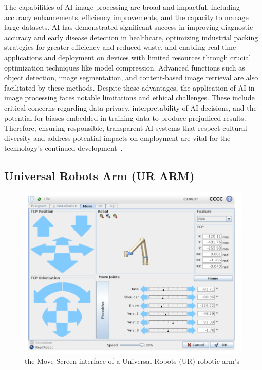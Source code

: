 \documentclass[12pt]{extarticle}
\begin{document}
The capabilities of AI image processing are broad and impactful, including accuracy enhancements, efficiency improvements, and the capacity to manage large datasets. AI has demonstrated significant success in improving diagnostic accuracy and early disease detection in healthcare, optimizing industrial packing strategies for greater efficiency and reduced waste, and enabling real-time applications and deployment on devices with limited resources through crucial optimization techniques like model compression. Advanced functions such as object detection, image segmentation, and content-based image retrieval are also facilitated by these methods. Despite these advantages, the application of AI in image processing faces notable limitations and ethical challenges. These include critical concerns regarding data privacy, interpretability of AI decisions, and the potential for biases embedded in training data to produce prejudiced results. Therefore, ensuring responsible, transparent AI systems that respect cultural diversity and address potential impacts on employment are vital for the technology's continued development~\cite{ai-in-image-processing}.

\subsection{Universal Robots Arm (UR ARM)}

\begin{figure}[htbp]
    \centering
    \includegraphics[width=0.8\linewidth]{images/UR_Arm_pic.png}
    \caption{the Move Screen interface of a Universal Robots (UR) robotic arm's ~\cite{urarm}}
    \label{fig:urarm}
\end{figure}
\end{document}
